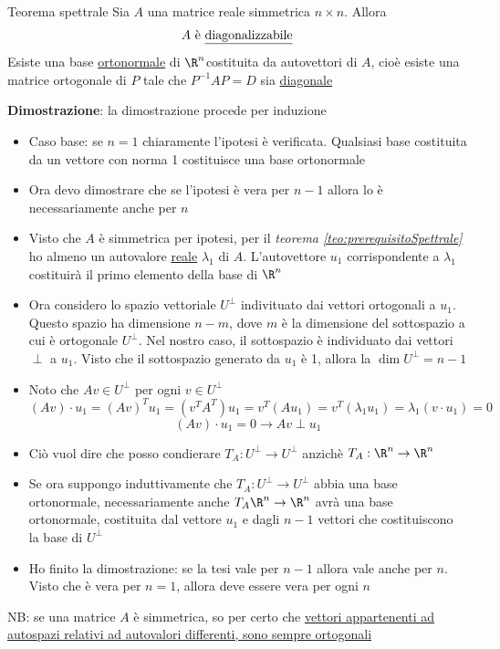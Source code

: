 \begin{teorema}{Teorema spettrale}
	Sia $ A  $ una matrice reale simmetrica $ n\times n $. Allora
	\[
		A \text{ è \underline{diagonalizzabile}}
	\]
	Esiste una base \underline{ortonormale} di $ \R^{n} $costituita da autovettori di $ A $, cioè esiste una matrice ortogonale di $ P $ tale che $ P^{-1}A P = D$ sia \underline{diagonale}
\end{teorema}
\textbf{Dimostrazione}: la dimostrazione procede per induzione
\begin{itemize}
	\item Caso base: se $ n = 1 $ chiaramente l'ipotesi è verificata. Qualsiasi base costituita da un vettore con norma 1 costituisce una base ortonormale
	\item Ora devo dimostrare che se l'ipotesi è vera per $ n-1 $ allora lo è necessariamente anche per $ n $
	\item Visto che $ A $ è simmetrica per ipotesi, per il \textit{teorema \ref{teo:prerequisitoSpettrale}} ho almeno un autovalore \underline{reale} $ \lambda_1 $ di $ A $. L'autovettore $ u_1 $ corrispondente a $ \lambda_1 $ costituirà il primo elemento della base di $ \R^{n} $
	\item Ora considero lo spazio vettoriale $ U^{\perp} $ indivituato dai vettori ortogonali a $ u_1 $. Questo spazio ha dimensione $ n-m $, dove $ m $ è la dimensione del sottospazio a cui è ortogonale $ U^{\perp} $. Nel nostro caso, il sottospazio è individuato dai vettori $ \perp $ a $ u_1 $. Visto che il sottospazio generato da $ u_1 $ è 1, allora la  $ \dim U^{\perp} = n-1$
	\item Noto che $ Av \in U^{\perp} $ per ogni $ v \in U^{\perp} $
	      \[
		      (A v) \cdot u_1=(A v)^T u_1=\left(v^T A^T\right) u_1=v^T\left(A u_1\right)=v^T\left(\lambda_1 u_1\right)=\lambda_1\left(v \cdot u_1\right)=0
	      \]
	      \[
		      \left( Av \right) \cdot u_1 = 0 \rightarrow Av \perp u_1
	      \]
	\item Ciò vuol dire che posso condierare $T_A : U^{\perp} \to U^{\perp} $ anzichè $ T_A : \R^{n} \to \R^{n} $
	\item Se ora suppongo induttivamente che $T_A : U^{\perp} \to U^{\perp} $ abbia una base ortonormale, necessariamente anche $ T_A \R^{n} \to \R^{n} $ avrà una base ortonormale, costituita dal vettore $ u_1 $ e dagli $ n-1 $ vettori che costituiscono la base di $ U^{\perp} $
	\item Ho finito la dimostrazione: se la tesi vale per $ n-1 $ allora vale anche per $ n $. Visto che è vera per $ n=1 $, allora deve essere vera per ogni $ n $
\end{itemize}
NB: se una matrice $ A $ è simmetrica, so per certo che \underline{vettori appartenenti ad autospazi relativi ad autovalori differenti, sono sempre ortogonali}


